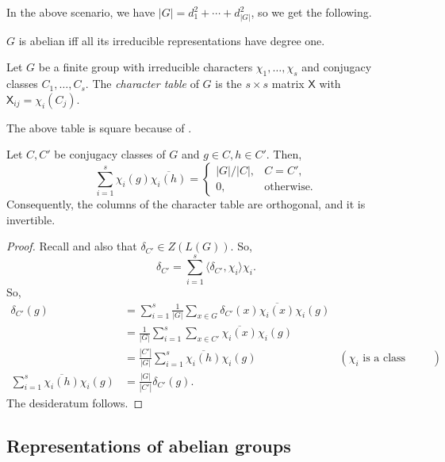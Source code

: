 		In the above scenario, we have $|G| = d_1^2 + \cdots + d_{|G|}^2$, so we get the following.

		\begin{fcor}
			$G$ is abelian iff all its irreducible representations have degree one.
		\end{fcor}


		\begin{fdef}
			Let $G$ be a finite group with irreducible characters $\chi_1,\ldots,\chi_s$ and conjugacy classes $C_1,\ldots,C_s$. The \emph{character table} of $G$ is the $s \times s$ matrix $\mathsf{X}$ with $\mathsf{X}_{ij} = \chi_i(C_j)$.
		\end{fdef}

		The above table is square because of .

		\begin{fprop}
			Let $C,C'$ be conjugacy classes of $G$ and $g \in C, h \in C'$. Then,
			\[ \sum_{i=1}^s \chi_i(g) \overline{\chi_i(h)} = \begin{cases} |G|/|C| , & C = C', \\ 0, & \text{otherwise.} \end{cases} \]
			Consequently, the columns of the character table are orthogonal, and it is invertible.
		\end{fprop}
		\begin{proof}
			Recall  and also that $\delta_{C'} \in Z(L(G))$. So,
			\[ \delta_{C'} = \sum_{i=1}^s \langle \delta_{C'} , \chi_i \rangle \chi_i. \]
			So,
			\begin{align*}
				\delta_{C'}(g) &= \sum_{i=1}^s \frac{1}{|G|} \sum_{x \in G} \delta_{C'}(x) \overline{\chi_i(x)} \chi_i(g) \\
					&= \frac{1}{|G|} \sum_{i=1}^s \sum_{x \in C'} \overline{\chi_i(x)} \chi_i(g) \\
					&= \frac{|C'|}{|G|} \sum_{i=1}^s \overline{\chi_i(h)} \chi_i(g) & (\chi_i \text{ is a class function}) \\
				\sum_{i=1}^s \overline{\chi_i(h)} \chi_i(g) &= \frac{|G|}{|C'|} \delta_{C'}(g).
			\end{align*}
			The desideratum follows.
		\end{proof}

	\subsection{Representations of abelian groups}

